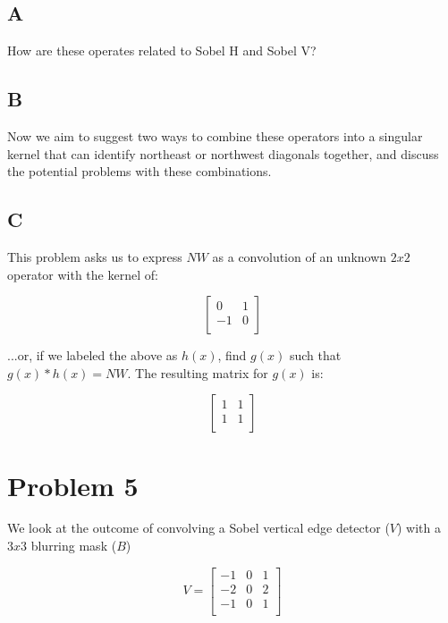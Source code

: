 \documentclass{article}
\begin{document}
\subsection*{A}

How are these operates related to Sobel H and Sobel V?

\subsection*{B}

Now we aim to suggest two ways to combine these operators into a singular kernel that can identify northeast or northwest diagonals together, and discuss the potential problems with these combinations.

\subsection*{C}

This problem asks us to express $NW$ as a convolution of an unknown $2x2$ operator with the kernel of:

\begin{equation}
    \begin{bmatrix}
        0 & 1 \\
        -1 & 0 \\
    \end{bmatrix}
\end{equation}

\noindent ...or, if we labeled the above as $h(x)$, find $g(x)$ such that $g(x)*h(x) = NW$. The resulting matrix for $g(x)$ is:

\begin{equation}
    \begin{bmatrix}
        1 & 1 \\
        1 & 1 \\
    \end{bmatrix}
\end{equation}

\section*{Problem 5}

We look at the outcome of convolving a Sobel vertical edge detector ($V$) with a $3x3$ blurring mask ($B$)

\begin{equation}
    V = \begin{bmatrix}
        -1 & 0 & 1 \\
        -2 & 0 & 2 \\
        -1 & 0 & 1 \\
    \end{bmatrix}
\end{equation}
\end{document}
